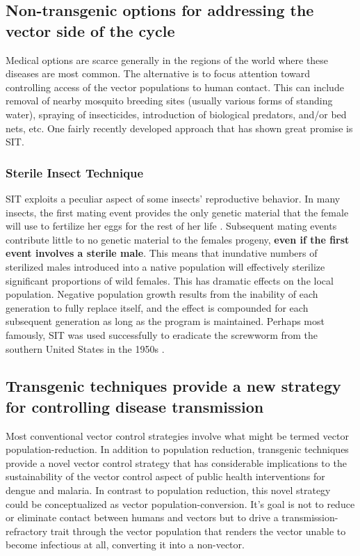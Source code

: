 \subsection[Addressing the vector side of the cycle (conventionally)]{Non-transgenic options for addressing the vector side of the cycle}

Medical options are scarce generally in the regions of the world where these diseases are most common.
The alternative is to focus attention toward controlling access of the vector populations to human contact.
This can include removal of nearby mosquito breeding sites (usually various forms of standing water), spraying of insecticides, introduction of biological predators, and/or bed nets, etc.
One fairly recently developed approach that has shown great promise is \gls{SIT}.



\subsubsection{Sterile Insect Technique}
\gls{SIT} exploits a peculiar aspect of some insects' reproductive behavior. 
In many insects, the first mating event provides the only genetic material that the female will use to fertilize her eggs for the rest of her life \CITEME.
Subsequent mating events contribute little to no genetic material to the females progeny, \textbf{even if the first event involves a sterile male}.
This means that inundative numbers of sterilized males introduced into a native population will effectively sterilize significant proportions of wild females.
This has dramatic effects on the local population.
Negative population growth results from the inability of each generation to fully replace itself, and the effect is compounded for each subsequent generation as long as the program is maintained.
Perhaps most famously, \gls{SIT} was used successfully to eradicate the screwworm from the southern United States in the 1950s \cite{Bushland1955}.


\subsection[Transgenesis provides new vector control strategy]{Transgenic techniques provide a new strategy for controlling disease transmission}

Most conventional vector control strategies involve what might be termed vector \gls{population-reduction}.
In addition to population reduction, transgenic techniques provide a novel vector control strategy that has considerable implications to the sustainability of the vector control aspect of public health interventions for dengue and malaria.
In contrast to population reduction, this novel strategy could be conceptualized as vector \gls{population-conversion}.
It's goal is not to reduce or eliminate contact between humans and vectors but to drive a transmission-refractory trait through the vector population that renders the vector unable to become infectious at all, converting it into a non-vector.

